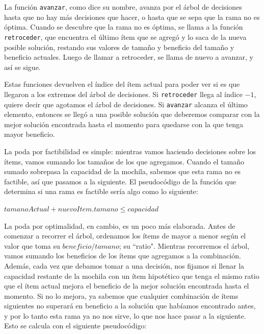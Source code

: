 \documentclass[10pt, a4paper]{article}
\begin{document}
La función \texttt{avanzar}, como dice su nombre, avanza por el árbol de decisiones hasta que no hay más decisiones que hacer, o hasta que se sepa que la rama no es óptima. Cuando se descubre que la rama no es óptima, se llama a la función \texttt{retroceder}, que encuentra el último ítem que se agregó y lo saca de la nueva posible solución, restando sus valores de tamaño y beneficio del tamaño y beneficio actuales. Luego de llamar a retroceder, se llama de nuevo a avanzar, y así se sigue.\par

Estas funciones devuelven el índice del ítem actual para poder ver si es que llegaron a los extremos del árbol de decisiones. Si \texttt{retroceder} llega al índice $-1$, quiere decir que agotamos el árbol de decisiones. Si \texttt{avanzar} alcanza el último elemento, entonces se llegó a una posible solución que deberemos comparar con la mejor solución encontrada hasta el momento para quedarse con la que tenga mayor beneficio.\par

La poda por factibilidad es simple: mientras vamos haciendo decisiones sobre los ítems, vamos sumando los tamaños de los que agregamos. Cuando el tamaño sumado sobrepasa la capacidad de la mochila, sabemos que esta rama no es factible, así que pasamos a la siguiente. El pseudocódigo de la función que determina si una rama es factible sería algo como lo siguiente:

\begin{algorithm}
\begin{algorithmic}[1]

	\State \Return $tamanoActual + nuevoItem.tamano \leq capacidad$
\EndFunction

\end{algorithmic}
\end{algorithm}

La poda por optimalidad, en cambio, es un poco más elaborada. Antes de comenzar a recorrer el árbol, ordenamos los ítems de mayor a menor según el valor que toma su $beneficio/tamano$; su ``ratio". Mientras recorremos el árbol, vamos sumando los beneficios de los ítems que agregamos a la combinación. Además, cada vez que debamos tomar a una decisión, nos fijamos si llenar la capacidad restante de la mochila con un ítem hipotético que tenga el mismo ratio que el ítem actual mejora el beneficio de la mejor solución encontrada hasta el momento. Si no lo mejora, ya sabemos que cualquier combinación de ítems siguientes no superará en beneficio a la solución que habíamos encontrado antes, y por lo tanto esta rama ya no nos sirve, lo que nos hace pasar a la siguiente. Esto se calcula con el siguiente pseudocódigo:\par
\end{document}
